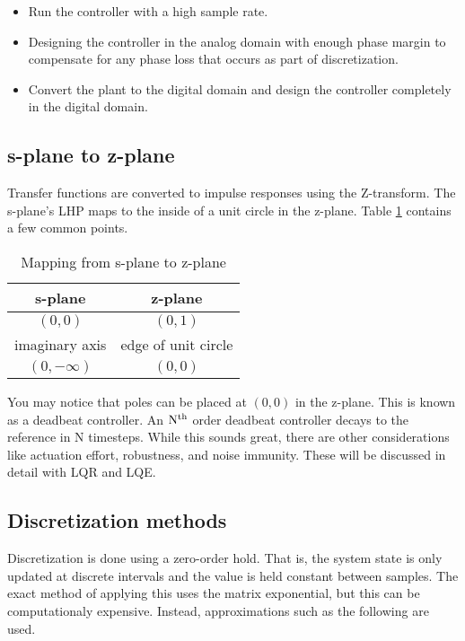 \begin{itemize}
  \item Run the controller with a high sample rate.
  \item Designing the controller in the analog domain with enough phase margin
    to compensate for any phase loss that occurs as part of discretization.
  \item Convert the \gls{plant} to the digital domain and design the controller
    completely in the digital domain.
\end{itemize}

\subsection{s-plane to z-plane}

Transfer functions are converted to impulse responses using the Z-transform. The
s-plane's LHP maps to the inside of a unit circle in the z-plane. Table
\ref{tab:s-plane2z-plane} contains a few common points. \\

\begin{table}
  \caption{Mapping from s-plane to z-plane}
  \renewcommand{\arraystretch}{1.3}
  \centering
  \begin{tabular}{|cc|}
    \hline
    \rowcolor{lightblue}
    \textbf{s-plane} & \textbf{z-plane} \\
    \hline
    $(0, 0)$ & $(0, 1)$ \\
    imaginary axis & edge of unit circle \\
    $(0, -\infty)$ & $(0, 0)$ \\
    \hline
  \end{tabular}
  \label{tab:s-plane2z-plane}
\end{table}

You may notice that poles can be placed at $(0, 0)$ in the z-plane. This is
known as a deadbeat controller. An $\rm N^{th}$ order deadbeat controller decays
to the \gls{reference} in N timesteps. While this sounds great, there are other
considerations like actuation effort, \gls{robustness}, and
\gls{noise immunity}. These will be discussed in detail with LQR and LQE.

\subsection{Discretization methods}

Discretization is done using a zero-order hold. That is, the system state is
only updated at discrete intervals and the value is held constant between
samples. The exact method of applying this uses the matrix exponential, but this
can be computationaly expensive. Instead, approximations such as the following
are used.

